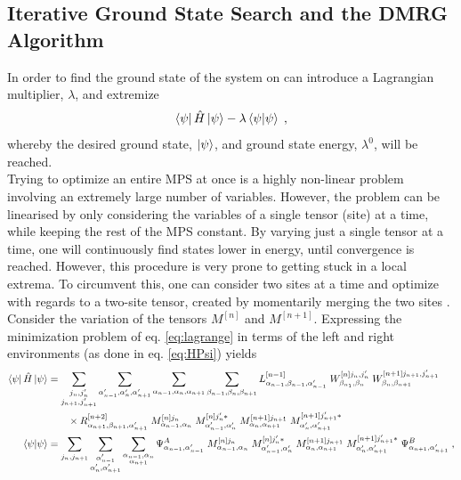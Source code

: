 \subsection{Iterative Ground State Search and the DMRG Algorithm} \label{sec:DMRG}
In order to find the ground state of the system on can introduce a Lagrangian multiplier, $\lambda$, and extremize
\begin{equation}
	\bra{\psi} \hat{H} \ket{\psi} - \lambda \braket{\psi | \psi} \; ,
	\label{eq:lagrange}
\end{equation}
whereby the desired ground state, $\ket{\psi}$, and ground state energy, $\lambda^0$, will be reached.\\
Trying to optimize an entire MPS at once is a highly non-linear problem involving an extremely large number of variables. However, the problem can be linearised by only considering the variables of a single tensor (site) at a time, while keeping the rest of the MPS constant. By varying just a single tensor at a time, one will continuously find states lower in energy, until convergence is reached. However, this procedure is very prone to getting stuck in a local extrema. To circumvent this, one can consider two sites at a time and optimize with regards to a two-site tensor, created by momentarily merging the two sites \cite{WhiteDMRG}.\\
Consider the variation of the tensors $M^{[n]}$ and $M^{[n+1]}$. Expressing the minimization problem of eq. \eqref{eq:lagrange} in terms of the left and right environments (as done in eq. \eqref{eq:HPsi}) yields
\begin{align}
	\bra{\psi} \hat{H} \ket{\psi} &= \sum_{\substack{j_n , j_n ' \\ j_{n+1} , j_{n+1} '}} \sum_{\alpha_{n-1} ' , \alpha_n ', \alpha_{n+1} '} \sum_{\alpha_{n-1} , \alpha_n , \alpha_{n+1}} \sum_{\beta_{n-1} , \beta_n , \beta_{n+1}} L_{\alpha_{n-1}, \beta_{n-1} , \alpha_{n-1} '}^{[n-1]} \; W_{\beta_{n_1}, \beta_n}^{[n] j_n , j_n '} \; W_{\beta_{n}, \beta_{n+1}}^{[n+1] j_{n+1} , j_{n+1} '} \nonumber \\
	& \qquad \times R_{\alpha_{n+1} ,\beta_{n+1} , \alpha_{n+1} '}^{[n+2]} \; M_{\alpha_{n-1} , \alpha_{n}}^{[n] j_n } \; M_{\alpha_{n-1} ' , \alpha_{n} '}^{[n] j_n ' *} \; M_{\alpha_{n} , \alpha_{n+1}}^{[n+1] j_{n+1} } \; M_{\alpha_{n} ' , \alpha_{n+1} '}^{[n+1] j_{n+1} ' *}  \label{eq:twositeHamil}\\
	\braket{\psi | \psi} &= \sum_{j_n , j_{n+1} } \sum_{\substack{\alpha_{n-1} ' \\ \alpha_n ', \alpha_{n+1} '}} \sum_{\substack{\alpha_{n-1} , \alpha_n \\ \alpha_{n+1}}} \Psi_{\alpha_{n-1},\alpha_{n-1}'}^{A} \; M_{\alpha_{n-1} , \alpha_{n}}^{[n] j_n } \; M_{\alpha_{n-1} ' , \alpha_{n} '}^{[n] j_n ' *} \; M_{\alpha_{n} , \alpha_{n+1}}^{[n+1] j_{n+1} } \; M_{\alpha_{n} ' , \alpha_{n+1} '}^{[n+1] j_{n+1} ' *} \; \Psi_{\alpha_{n+1},\alpha_{n+1}'}^{B} \; , \label{eq:twositeOverlap}
\end{align}
